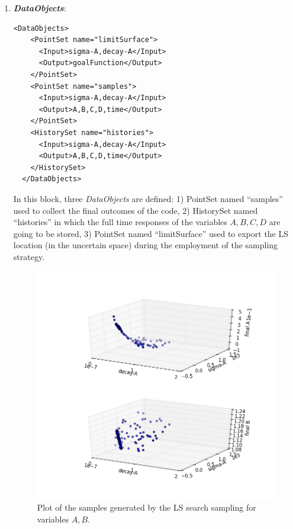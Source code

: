 \begin{enumerate}
   \item \textbf{\textit{DataObjects}}:
\begin{lstlisting}[style=XML,morekeywords={arg,extension,pauseAtEnd,overwrite}]
  <DataObjects>
    <PointSet name="limitSurface">
      <Input>sigma-A,decay-A</Input>
      <Output>goalFunction</Output>
    </PointSet>
    <PointSet name="samples">
      <Input>sigma-A,decay-A</Input>
      <Output>A,B,C,D,time</Output>
    </PointSet>
    <HistorySet name="histories">
      <Input>sigma-A,decay-A</Input>
      <Output>A,B,C,D,time</Output>
    </HistorySet>
  </DataObjects>
\end{lstlisting}
  In this block, three \textit{DataObjects} are defined: 1) PointSet 
  named ``samples'' used to collect the final outcomes of the code, 2) 
  HistorySet named ``histories'' in which the full time responses of the 
  variables $A,B,C,D$ are going to be stored, 3) PointSet named    
  ``limitSurface'' used  to export the LS location (in the uncertain space) during the employment of the sampling strategy.
 \begin{figure}[h!]
  \centering
  \includegraphics[scale=0.7]{pics/LS_pointsets.png}
  \caption{Plot of the samples generated by the LS search sampling for variables $A,B$.}
  \label{fig:LS_pointsets}

\end{figure}
\end{enumerate}
